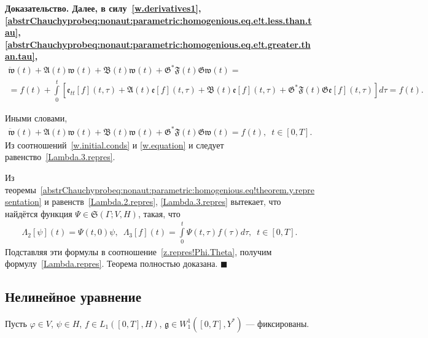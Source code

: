\documentclass{report}
\newcounter{rem}[section]
\newcounter{theor}[section]
\newenvironment{Proof}{\par\noindent\bf Доказательство.\rm}{ $\blacksquare$\par}
\begin{document}
\begin{Proof}
Далее, в силу~\eqref{w.derivatives1}, \eqref{abstrChauchyprobeq:nonaut:parametric:homogenious.eq.e!t.less.than.tau}, \eqref{abstrChauchyprobeq:nonaut:parametric:homogenious.eq.e!t.greater.than.tau},
\begin{gather*}
\ddot{\mathfrak{w}}(t)+\mathfrak{A}(t){\mathfrak{w}}(t)+\mathfrak{B}(t){\mathfrak{w}}(t) + \mathfrak{G}^*\mathfrak{F}(t)\mathfrak{G}{\mathfrak{w}}(t)=\\
=f(t)+\int\limits_0^t[\mathfrak{e}_{tt}[f](t,\tau)+\mathfrak{A}(t)\mathfrak{e}[f](t,\tau)+\mathfrak{B}(t)\mathfrak{e}[f](t,\tau) + \mathfrak{G}^*\mathfrak{F}(t)\mathfrak{G}\mathfrak{e}[f](t,\tau)]d\tau=f(t).
\end{gather*}

Иными словами, 
\begin{gather}\label{w.equation}
\ddot{\mathfrak{w}}(t)+\mathfrak{A}(t){\mathfrak{w}}(t)+\mathfrak{B}(t){\mathfrak{w}}(t) + \mathfrak{G}^*\mathfrak{F}(t)\mathfrak{G}{\mathfrak{w}}(t)=f(t),\,\,\,t\in[0,T].
\end{gather}
Из соотношений~\eqref{w.initial.conds} и \eqref{w.equation} и следует равенство~\eqref{Lambda.3.repres}.

Из теоремы~\ref{abstrChauchyprobeq:nonaut:parametric:homogenious.eq!theorem.y.representation} и равенств~\eqref{Lambda.2.repres}, \eqref{Lambda.3.repres} вытекает, что найдётся функция $\Psi\in\mathfrak{S}(\Gamma; V,H)$,
такая, что
\begin{gather*}
\Lambda_2[\psi](t)=\Psi(t,0)\psi,\,\,\,\Lambda_3[f](t)=\int\limits_0^t\Psi(t,\tau)f(\tau)d\tau,\,\,\,t\in[0,T].
\end{gather*}
Подставляя эти формулы в соотношение~\eqref{z.repres!Phi.Theta}, получим формулу~\eqref{Lambda.repres}. Теорема полностью доказана.
\end{Proof}    

	    \subsection{Нелинейное уравнение}
Пусть $\varphi\in V$, $\psi\in H$, $f\in L_1([0,T],H)$, $\mathfrak{g}\in W^1_1([0,T], Y^*)$ --- фиксированы.
\end{document}
